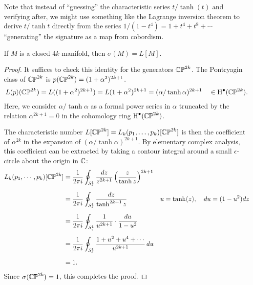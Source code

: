 \begin{remark*}
	Note that instead of ``guessing'' the characteristic series $t/\tanh(t)$ and verifying after, we might use something like the Lagrange inversion theorem to derive $t/\tanh t$ directly from the series $1/(1-t^4)=1+t^4+t^8+\cdots$ ``generating'' the signature as a map from cobordism. 
\end{remark*}
%

\begin{theorem}[Hirzebruch]\label{thm:hirzebruch-signature-theorem}
	If $M$ is a closed $4k$-manifold, then $\sigma(M) = L[M]$.
\end{theorem}
\begin{proof}
	It suffices to check this identity for the generators $\mathbb{CP}^{2k}$. The Pontryagin class of $\mathbb{CP}^{2k}$ is $p(\mathbb{CP}^{2k})=(1+\alpha^2)^{2k+1}$.
	\[
		\begin{aligned}
			L(p)(\mathbb{CP}^{2k})
			= L((1+\alpha^2)^{2k+1})
			= L(1+\alpha^2)^{2k+1}
			= (\alpha/\tanh \alpha)^{2k+1}
			\quad\in\operatorname{H}^\bullet(\mathbb{CP}^{2k}).
		\end{aligned}
	\]
	Here, we consider $\alpha/\tanh \alpha$ as a formal power series in $\alpha$ truncated by the relation $\alpha^{2k+1}=0$ in the cohomology ring $\operatorname{H}^\bullet(\mathbb{CP}^{2k})$. 

	The characteristic number $L[\mathbb{CP}^{2k}]=L_k(p_1,\ldots,p_k)[\mathbb{CP}^{2k}]$ is then the coefficient of $\alpha^{2k}$ in the expansion of $(\alpha/\tanh \alpha)^{2k+1}$.
	By elementary complex analysis, this coefficient can be extracted by taking a contour integral around a small $\epsilon$-circle about the origin in $\mathbb{C}$:
	\[
		\begin{aligned}
			L_k(p_1,\cdots, p_k)[\mathbb{CP}^{2k}]
			 & = \frac{1}{2\pi i}\oint_{S^1_\varepsilon} \frac{dz}{z^{2k+1}} \left(\frac{z}{\tanh z}\right)^{2k+1}
			 &                                                                                                    \\[0.5em]
			 & = \frac{1}{2\pi i}\oint_{S^1_\varepsilon} \frac{dz}{\tanh^{2k+1} z}\quad
			 & u  =\tanh(z),\quad
			du =(1-u^2)dz
			\\[0.5em]
			 & = \frac{1}{2\pi i}\oint_{S^1_\varepsilon} \frac{1}{u^{2k+1}}\cdot\frac{du}{1-u^2}
			 &                                                                                                    \\[0.5em]
			 & = \frac{1}{2\pi i}\oint_{S^1_\varepsilon} \frac{1+u^2+u^4+\cdots}{u^{2k+1}}\,du                       \\[0.5em]
			 & =1.                                                                                              &
		\end{aligned}
	\]
	Since $\sigma(\mathbb{CP}^{2k})=1$, this completes the proof.
\end{proof}

